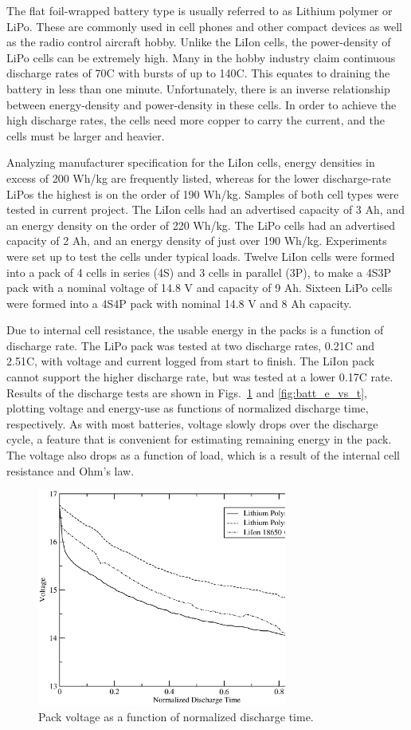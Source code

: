 \documentclass{ifacconf}
\begin{document}
The flat foil-wrapped battery type is usually referred to as Lithium polymer or LiPo. These are commonly used in cell phones and other compact devices as well as the radio control aircraft hobby. Unlike the LiIon cells, the power-density of LiPo cells can be extremely high. Many in the hobby industry claim continuous discharge rates of 70C with bursts of up to 140C. This equates to draining the battery in less than one minute. Unfortunately, there is an inverse relationship between energy-density and power-density in these cells. In order to achieve the high discharge rates, the cells need more copper to carry the current, and the cells must be larger and heavier.

Analyzing manufacturer specification for the LiIon cells, energy densities in excess of 200 Wh/kg are frequently listed, whereas for the lower discharge-rate LiPos the highest is on the order of 190 Wh/kg. Samples of both cell types were tested in current project. The LiIon cells had an advertised capacity of 3 Ah, and an energy density on the order of 220 Wh/kg. The LiPo cells had an advertised capacity of 2 Ah, and an energy density of just over 190 Wh/kg. Experiments were set up to test the cells under typical loads. Twelve LiIon cells were formed into a pack of 4 cells in series (4S) and 3 cells in parallel (3P), to make a 4S3P pack with a nominal voltage of 14.8 V and capacity of 9 Ah. Sixteen LiPo cells were formed into a 4S4P pack with nominal 14.8 V and 8 Ah capacity.

Due to internal cell resistance, the usable energy in the packs is a function of discharge rate. The LiPo pack was tested at two discharge rates, 0.21C and 2.51C, with voltage and current logged from start to finish. The LiIon pack cannot support the higher discharge rate, but was tested at a lower 0.17C rate. Results of the discharge tests are shown in Figs.~\ref{fig:batt_v_vs_t} and \ref{fig:batt_e_vs_t}, plotting voltage and energy-use as functions of normalized discharge time, respectively. As with most batteries, voltage slowly drops over the discharge cycle, a feature that is convenient for estimating remaining energy in the pack. The voltage also drops as a function of load, which is a result of the internal cell resistance and Ohm's law.

\begin{figure}
  \centering
  \includegraphics[width=82mm]{Figures/V_versus_T.eps}
  \caption{Pack voltage as a function of normalized discharge time.}
  \label{fig:batt_v_vs_t}
\end{figure}
\end{document}
